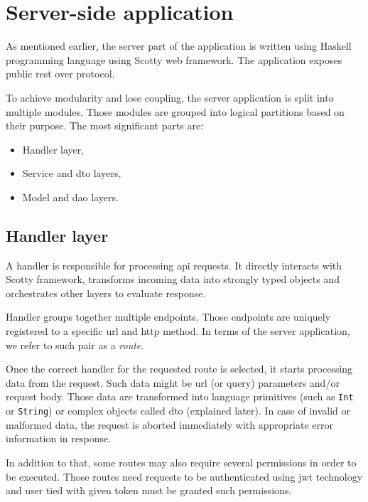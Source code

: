 \section{Server-side application}

As mentioned earlier, the server part of the application is written using Haskell programming language using Scotty web framework.
The application exposes public \gls{rest}  over  protocol.

To achieve modularity and lose coupling, the server application is split into multiple modules.
Those modules are grouped into logical partitions based on their purpose.
The most significant parts are:

\begin{itemize}
    \item Handler layer,
    \item Service and \gls{dto} layers,
    \item Model and \gls{dao} layers.
\end{itemize}

\subsection{Handler layer}\label{sec:handler}
A handler is responsible for processing \gls{api} requests.
It directly interacts with Scotty framework, transforms incoming data into strongly typed objects and orchestrates other layers to evaluate response.

Handler groups together multiple endpoints.
Those endpoints are uniquely registered to a specific \gls{url} and \gls{http} method.
In terms of the server application, we refer to such pair as a \textit{route}.


Once the correct handler for the requested route is selected, it starts processing data from the request.
Such data might be \gls{url} (or query) parameters and/or request body.
Those data are transformed into language primitives (such as \texttt{Int} or \texttt{String}) or complex objects called \gls{dto} (explained later).
In case of invalid or malformed data, the request is aborted immediately with appropriate error information in response.

In addition to that, some routes may also require several permissions in order to be executed.
Those routes need requests to be authenticated using \gls{jwt} technology and user tied with given token must be granted such permissions.

